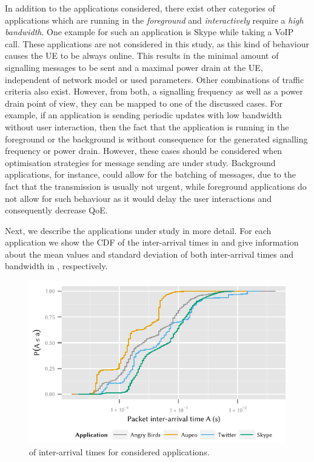 In addition to the applications considered, there exist other categories of applications which are running in the \emph{foreground} and \emph{interactively} require a \emph{high bandwidth}.
One example for such an application is Skype while taking a \gls{VoIP} call.
These applications are not considered in this study, as this kind of behaviour causes the \gls{UE} to be always online.
This results in the minimal amount of signalling messages to be sent and a maximal power drain at the \gls{UE}, independent of network model or used parameters.
Other combinations of traffic criteria also exist.
However, from both, a signalling frequency as well as a power drain point of view, they can be mapped to one of the discussed cases.
For example, if an application is sending periodic updates with low bandwidth without user interaction, then the fact that the application is running in the foreground or the background is without consequence for the generated signalling frequency or power drain.
However, these cases should be considered when optimisation strategies for message sending are under study.
Background applications, for instance, could allow for the batching of messages, due to the fact that the transmission is usually not urgent, while foreground applications do not allow for such behaviour as it would delay the user interactions and consequently decrease \gls{QoE}.

Next, we describe the applications under study in more detail.
For each application we show the \gls{CDF} of the inter-arrival times in  and give information about the mean values and standard deviation of both inter-arrival times and bandwidth in , respectively.

\begin{figure}
\centering
\includegraphics{network/network_traces/numerical_results/figures/interarrival_times}
\caption{ of inter-arrival times for considered applications.}\label{fig:network:network_traces:numerical_results:traffic:interarrival_times}
\end{figure}

